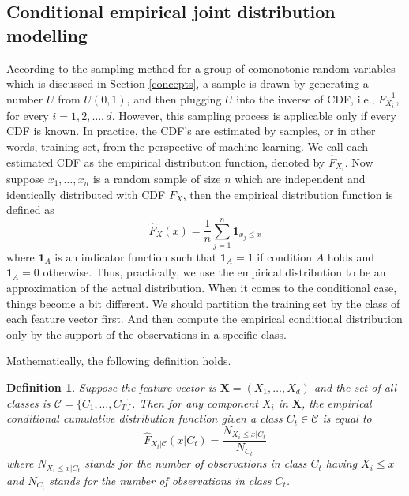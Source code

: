 \documentclass[twoside,11pt]{article}
\newtheorem{definition}{Definition}[subsection]
\begin{document}
\subsection{Conditional empirical joint distribution modelling}\label{cond_joint_dist}
According to the sampling method for a group of comonotonic random variables which is discussed in Section \ref{concepts}, a sample is drawn by generating a number $U$ from $U(0,1)$, and then plugging $U$ into the inverse of CDF, i.e., $F_{X_i}^{-1}$, for every $i=1,2,\dots,d$. However, this sampling process is applicable only if every CDF is known. In practice, the CDF's are estimated by samples, or in other words, training set, from the perspective of machine learning. We call each estimated CDF as the empirical distribution function, denoted by $\hat{F}_{X_i}$. Now suppose $x_1,\dots,x_n$ is a random sample of size $n$ which are independent and identically distributed with CDF $F_X$, then the empirical distribution function is defined as
\begin{equation*}\label{empirical_cdf}
    \hat{F}_X(x) = \frac{1}{n}\sum_{j=1}^n \mathbf{1}_{x_j\leq x}
\end{equation*}
where $\mathbf{1}_A$ is an indicator function such that $\mathbf{1}_A=1$ if condition $A$ holds and $\mathbf{1}_A=0$ otherwise. Thus, practically, we use the empirical distribution to be an approximation of the actual distribution. When it comes to the conditional case, things become a bit different. We should partition the training set by the class of each feature vector first. And then compute the empirical conditional distribution only by the support of the observations in a specific class.

Mathematically, the following definition holds.
\begin{definition}
Suppose the feature vector is $\mathbf{X}=(X_1,\dots,X_d)$ and the set of all classes is $\mathcal{C}=\{C_1,\dots,C_T\}$. Then for any component $X_i$ in $\mathbf{X}$, the empirical conditional cumulative distribution function given a class $C_t\in \mathcal{C}$ is equal to
\begin{equation*}
    \hat{F}_{X_i|\mathcal{C}}(x|C_t)=\frac{N_{X_i\leq x|C_t}}{N_{C_t}}
\end{equation*}
where $N_{X_i\leq x|C_t}$ stands for the number of observations in class $C_t$ having $X_i\leq x$ and $N_{C_t}$ stands for the number of observations in class $C_t$.
\end{definition}
\end{document}
